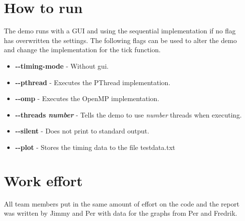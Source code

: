 \documentclass[a4paper,11pt]{article}
\begin{document}
\section{How to run}
The demo runs with a GUI and using the sequential implementation
if no flag has overwritten the settings. The following flags can be
used to alter the demo and change the implementation for the tick
function.
\begin{itemize}[label=,leftmargin=0pt]
\item \textbf{-\--timing-mode} - Without gui.
\item \textbf{-\--pthread} - Executes the PThread implementation.
\item \textbf{-\--omp} - Executes the OpenMP implementation.
\item \textbf{-\--threads \textit{number}} - Tells the demo to use
  \textit{number} threads when executing.
\item \textbf{-\--silent} - Does not print to standard output.
\item \textbf{-\--plot} - Stores the timing data to the file testdata.txt
\end{itemize}
\section*{Work effort}
All team members put in the same amount of effort on the code and the
report was written by Jimmy and Per with data for the graphs from Per
and Fredrik.
\end{document}
